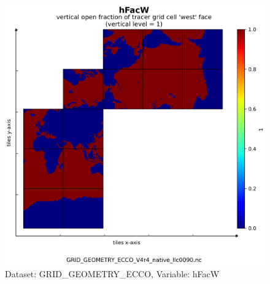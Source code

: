 \begin{figure}[H]
\centering
\includegraphics[scale=0.55]{../images/plots/native_plots_coords/Geometry_Parameters_for_the_Lat-Lon-Cap_90_(llc90)_Native_Model_Grid_(Version_4_Release_4)/hFacW.png}
\caption{Dataset: GRID\_GEOMETRY\_ECCO, Variable: hFacW}
\label{tab:table-GRID_GEOMETRY_ECCO_hFacW-Plot}
\end{figure}
\newpage
\pagebreak
